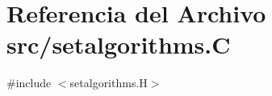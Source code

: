 \hypertarget{setalgorithms_8_c}{}\section{Referencia del Archivo src/setalgorithms.C}
\label{setalgorithms_8_c}
{\ttfamily \#include $<$setalgorithms.\+H$>$}\newline
